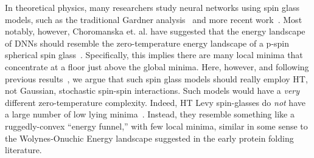 In theoretical physics, many researchers study neural networks using spin glass models, such as the traditional Gardner analysis~\cite{GD89,EB01_BOOK} and more recent work~\cite{PSG17_TR,PSG18_TR}.
Most notably, however, Choromanska et. al. have suggested that the energy landscape of DNNs should resemble the zero-temperature energy landscape of a p-spin spherical spin glass~\cite{CHMAx14_TR}.
Specifically, 
this implies 
there are many local minima that concentrate at a floor just above the global minima. 
Here, however, and following previous results~\cite{MM18_TR,MM19_HTSR_ICML}, we argue that such spin glass models should really employ HT, not Gaussian, stochastic spin-spin interactions.
Such models would have a \emph{very} different zero-temperature complexity. 
Indeed, HT Levy spin-glasses do \emph{not} have a large number of low lying minima~\cite{CB93,galluccio1998,GabKon99}.
Instead, they resemble something like a ruggedly-convex ``energy funnel,'' with few local minima, similar in some sense to the Wolynes-Onuchic Energy landscape \cite{wolynes_proteins_95,wolynes_arpc_97} suggested in the early protein folding literature.





